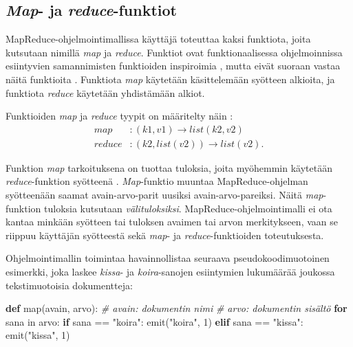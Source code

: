 \documentclass[finnish]{templates/tktltiki2}
\newenvironment{Shaded}{}{}
\newcommand{\KeywordTok}[1]{\textcolor[rgb]{0.00,0.44,0.13}{\textbf{{#1}}}}
\newcommand{\DataTypeTok}[1]{\textcolor[rgb]{0.56,0.13,0.00}{{#1}}}
\newcommand{\DecValTok}[1]{\textcolor[rgb]{0.25,0.63,0.44}{{#1}}}
\newcommand{\StringTok}[1]{\textcolor[rgb]{0.25,0.44,0.63}{{#1}}}
\newcommand{\CommentTok}[1]{\textcolor[rgb]{0.38,0.63,0.69}{\textit{{#1}}}}
\newcommand{\NormalTok}[1]{{#1}}
\theoremstyle{definition}
\theoremstyle{remark}
\begin{document}
\subsection{\emph{Map}- ja
\emph{reduce}-funktiot}\label{map--ja-reduce-funktiot}

MapReduce-ohjelmointimallissa käyttäjä toteuttaa kaksi funktiota, joita
kutsutaan nimillä \emph{map} ja \emph{reduce}. Funktiot ovat
funktionaalisessa ohjelmoinnissa esiintyvien samannimisten funktioiden
inspiroimia \cite{mapreduce}, mutta eivät suoraan vastaa
näitä funktioita \cite{mapreduce-revisited}. Funktiota
\emph{map} käytetään käsittelemään syötteen alkioita, ja funktiota
\emph{reduce} käytetään yhdistämään alkiot.

Funktioiden \emph{map} ja \emph{reduce} tyypit on määritelty näin
\cite{mapreduce}: \[
\begin{aligned}
map &: (k1, v1) \to list(k2, v2) \\
reduce &: (k2, list(v2)) \to list(v2).
\end{aligned}
\]

Funktion \emph{map} tarkoituksena on tuottaa tuloksia, joita myöhemmin
käytetään \emph{reduce}-funktion syötteenä \cite{mapreduce}.
\emph{Map}-funktio muuntaa MapReduce-ohjelman syötteenään saamat
avain-arvo-parit uusiksi avain-arvo-pareiksi. Näitä \emph{map}-funktion
tuloksia kutsutaan \emph{välituloksiksi}. MapReduce-ohjelmointimalli ei
ota kantaa minkään syötteen tai tuloksen avaimen tai arvon merkitykseen,
vaan se riippuu käyttäjän syötteestä sekä \emph{map}- ja
\emph{reduce}-funktioiden toteutuksesta.

Ohjelmointimallin toimintaa havainnollistaa seuraava
pseudokoodimuotoinen esimerkki, joka laskee \emph{kissa}- ja
\emph{koira}-sanojen esiintymien lukumäärää joukossa tekstimuotoisia
dokumentteja:

\begin{Shaded}
\begin{Highlighting}[]
\KeywordTok{def} \DataTypeTok{map}\NormalTok{(avain, arvo):}
    \CommentTok{# avain: dokumentin nimi}
    \CommentTok{# arvo: dokumentin sisältö}
    \KeywordTok{for} \NormalTok{sana in arvo:}
        \KeywordTok{if} \NormalTok{sana == }\StringTok{"koira"}\NormalTok{:}
            \NormalTok{emit(}\StringTok{"koira"}\NormalTok{, }\DecValTok{1}\NormalTok{)}
        \KeywordTok{elif} \NormalTok{sana == }\StringTok{"kissa"}\NormalTok{:}
            \NormalTok{emit(}\StringTok{"kissa"}\NormalTok{, }\DecValTok{1}\NormalTok{)    }
\end{Highlighting}
\end{Shaded}
\end{document}
